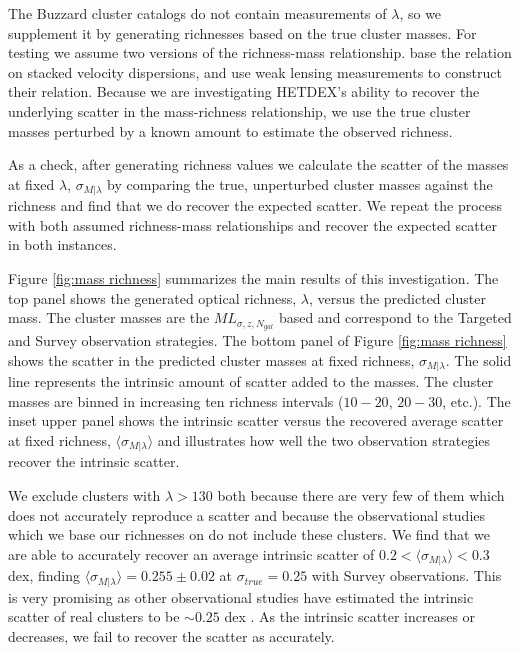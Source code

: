 \documentclass[fleqn,usenatbib]{mnras}
\begin{document}
The Buzzard cluster catalogs do not contain measurements of $\lambda$, so we supplement it by generating richnesses based on the true cluster masses. For testing we assume two versions of the richness-mass relationship. \cite{Farahi2016} base the relation on stacked velocity dispersions, and \cite{Simet2016} use weak lensing measurements to construct their relation. Because we are investigating HETDEX's ability to recover the underlying scatter in the mass-richness relationship, we use the true cluster masses perturbed by a known amount to estimate the observed richness. 

As a check, after generating richness values we calculate the scatter of the masses at fixed $\lambda$, $\sigma_{M|\lambda}$ by comparing the true, unperturbed cluster masses against the richness and find that we do recover the expected scatter. We repeat the process with both assumed richness-mass relationships and recover the expected scatter in both instances. 

Figure \ref{fig:mass richness} summarizes the main results of this investigation. The top panel shows the generated optical richness, $\lambda$, versus the predicted cluster mass. The cluster masses are the $ML_{\sigma, z, N_{gal}}$ based and correspond to the Targeted and Survey observation strategies. The bottom panel of Figure \ref{fig:mass richness} shows the scatter in the predicted cluster masses at fixed richness, $\sigma_{M|\lambda}$. The solid line represents the intrinsic amount of scatter added to the masses. The cluster masses are binned in increasing ten richness intervals ($10-20$, $20-30$, etc.). The inset upper panel shows the intrinsic scatter versus the recovered average scatter at fixed richness, $\langle \sigma_{M|\lambda} \rangle$ and illustrates how well the two observation strategies recover the intrinsic scatter.

We exclude clusters with $\lambda>130$ both because there are very few of them which does not accurately reproduce a scatter and because the observational studies which we base our richnesses on do not include these clusters. We find that we are able to accurately recover an average intrinsic scatter of $0.2 <\langle \sigma_{M|\lambda} \rangle <0.3$ dex, finding $\langle \sigma_{M|\lambda} \rangle = 0.255\pm{0.02}$ at $\sigma_{true} = 0.25$ with Survey observations. This is very promising as other observational studies have estimated the intrinsic scatter of real clusters to be $\sim0.25$ dex . As the intrinsic scatter increases or decreases, we fail to recover the scatter as accurately.
\end{document}
